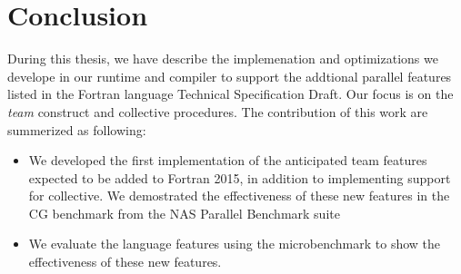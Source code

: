 \chapter{Conclusion}\label{chap:Conclusion}

During this thesis, we have describe the implemenation and optimizations we develope in our runtime and compiler to support the addtional parallel features listed in the Fortran language Technical Specification Draft. Our focus is on the \textit{team} construct and collective procedures. The contribution of this work are summerized as following:
\begin{itemize}
\item We developed the first implementation of the anticipated team features expected to be added to Fortran 2015, in addition to implementing support for collective. We demostrated the effectiveness of these new features in the CG benchmark from the NAS Parallel Benchmark suite
\item We evaluate the language features using the microbenchmark to show the effectiveness of these new features. 
\end{itemize}

